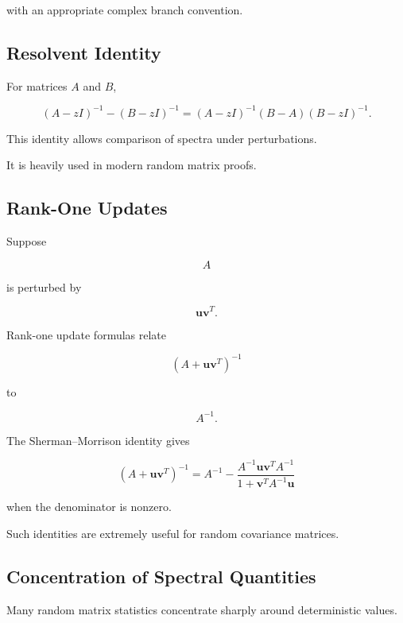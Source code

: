with an appropriate complex branch convention.

\subsection{Resolvent Identity}
\label{subsec:resolvent-identity}

For matrices \(A\) and \(B\),

\[
\boxed{
(A-zI)^{-1}
-
(B-zI)^{-1}
=
(A-zI)^{-1}
(B-A)
(B-zI)^{-1}.
}
\]

This identity allows comparison of spectra under perturbations.

It is heavily used in modern random matrix proofs.

\subsection{Rank-One Updates}
\label{subsec:rank-one-updates-rmt}

Suppose

\[
A
\]

is perturbed by

\[
\mathbf{u}\mathbf{v}^T.
\]

Rank-one update formulas relate

\[
(A+\mathbf{u}\mathbf{v}^T)^{-1}
\]

to

\[
A^{-1}.
\]

The Sherman--Morrison identity gives

\[
\boxed{
(A+\mathbf{u}\mathbf{v}^T)^{-1}
=
A^{-1}
-
\frac{
A^{-1}\mathbf{u}\mathbf{v}^TA^{-1}
}{
1+\mathbf{v}^TA^{-1}\mathbf{u}
}
}
\]

when the denominator is nonzero.

Such identities are extremely useful for random covariance matrices.

\subsection{Concentration of Spectral Quantities}
\label{subsec:spectral-concentration}

Many random matrix statistics concentrate sharply around deterministic
values.

